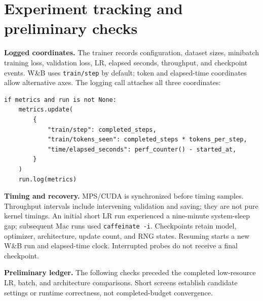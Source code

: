 \clearpage
{}
\section{Experiment tracking and preliminary checks}
\label{app:experiment_details}

\textbf{Logged coordinates.}
The trainer records configuration, dataset sizes, minibatch training loss,
validation loss, LR, elapsed seconds, throughput, and checkpoint events.
W\&B uses \texttt{train/step} by default; token and elapsed-time coordinates
allow alternative axes. The logging call attaches all three coordinates:

\par\noindent
\begin{minipage}{\linewidth}
\begin{lstlisting}[caption={Step, token, and elapsed-time coordinates for experiment metrics.}]
if metrics and run is not None:
    metrics.update(
        {
            "train/step": completed_steps,
            "train/tokens_seen": completed_steps * tokens_per_step,
            "time/elapsed_seconds": perf_counter() - started_at,
        }
    )
    run.log(metrics)
\end{lstlisting}
\end{minipage}\par

\textbf{Timing and recovery.}
MPS/CUDA is synchronized before timing samples. Throughput intervals include
intervening validation and saving; they are not pure kernel timings. An
initial short LR run experienced a nine-minute system-sleep gap; subsequent
Mac runs used \texttt{caffeinate -i}. Checkpoints retain model, optimizer,
architecture, update count, and RNG states. Resuming starts a new W\&B run
and elapsed-time clock. Interrupted probes do not receive a final checkpoint.

\textbf{Preliminary ledger.}
The following checks preceded the completed low-resource LR, batch, and
architecture comparisons. Short screens establish candidate settings or
runtime correctness, not completed-budget convergence.

